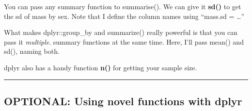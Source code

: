 \documentclass[]{book}
\newenvironment{Shaded}{\begin{snugshade}}{\end{snugshade}}
\newcommand{\KeywordTok}[1]{\textcolor[rgb]{0.13,0.29,0.53}{\textbf{#1}}}
\newcommand{\DataTypeTok}[1]{\textcolor[rgb]{0.13,0.29,0.53}{#1}}
\newcommand{\StringTok}[1]{\textcolor[rgb]{0.31,0.60,0.02}{#1}}
\newcommand{\CommentTok}[1]{\textcolor[rgb]{0.56,0.35,0.01}{\textit{#1}}}
\newcommand{\OperatorTok}[1]{\textcolor[rgb]{0.81,0.36,0.00}{\textbf{#1}}}
\newcommand{\NormalTok}[1]{#1}
\theoremstyle{definition}
\theoremstyle{definition}
\theoremstyle{definition}
\theoremstyle{remark}
\begin{document}
You can pass any summary function to summarise(). We can give it
\textbf{sd()} to get the sd of mass by sex. Note that I define the
column names using ``mass.sd = \ldots{}''

\begin{Shaded}
\end{Shaded}

What makes dplyr::group\_by and summarize() really powerful is that you
can pass it \emph{multiple}. summary functions at the same time. Here,
I'll pass mean() and sd(), naming both.

\begin{Shaded}
\end{Shaded}

dplyr also has a handy function \textbf{n()} for getting your sample
size.

\begin{Shaded}
\end{Shaded}

\begin{center}\rule{0.5\linewidth}{\linethickness}\end{center}

\subsection{OPTIONAL: Using novel functions with
dplyr}\label{optional-using-novel-functions-with-dplyr}
\end{document}
